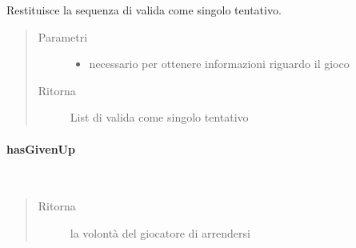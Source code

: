 \documentclass[letterpaper,10pt,italian,openany,oneside]{sphinxmanual}
\begin{document}
\begin{fulllineitems}
\label{\detokenize{source/it/unicam/cs/pa/mastermind/players/CodeBreaker:it.unicam.cs.pa.mastermind.players.CodeBreaker.getAttempt(InteractionView)}}
Restituisce la sequenza di  valida come singolo tentativo.
\begin{quote}\begin{description}
\item[{Parametri}] \leavevmode\begin{itemize}
\item {} 
 \textendash{} necessario per ottenere informazioni riguardo il gioco

\end{itemize}

\item[{Ritorna}] \leavevmode
List di  valida come singolo tentativo

\end{description}\end{quote}

\end{fulllineitems}



\paragraph{hasGivenUp}
\label{\detokenize{source/it/unicam/cs/pa/mastermind/players/CodeBreaker:hasgivenup}}

\begin{fulllineitems}
\label{\detokenize{source/it/unicam/cs/pa/mastermind/players/CodeBreaker:it.unicam.cs.pa.mastermind.players.CodeBreaker.hasGivenUp()}}~\begin{quote}\begin{description}
\item[{Ritorna}] \leavevmode
la volontà del giocatore  di arrendersi

\end{description}\end{quote}

\end{fulllineitems}
\end{document}
